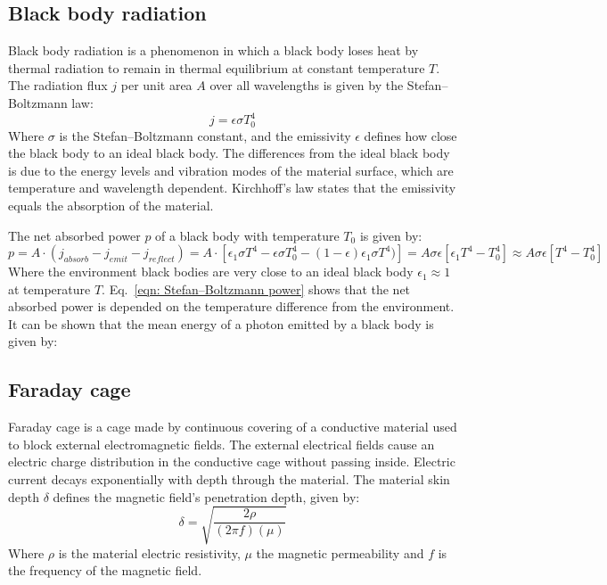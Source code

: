 \documentclass[\main/master.tex]{subfiles}
\begin{document}
\subsection{Black body radiation}
Black body radiation is a phenomenon in which a black body loses heat by thermal radiation to remain in thermal equilibrium at constant temperature $T$. The radiation flux $j$ per unit area $A$ over all wavelengths is given by the Stefan–Boltzmann law:
\begin{equation}
j = \epsilon\sigma T_0^4  \label{eqn: Stefan–Boltzmann law}
\end{equation}
Where $\sigma$ is the Stefan–Boltzmann constant, and the emissivity $\epsilon$ defines how close the black body to an ideal black body. The differences from the ideal black body is due to the energy levels and vibration modes of the material surface, which are temperature and wavelength dependent. Kirchhoff's law states that the emissivity equals the absorption of the material.
\par\noindent
The net absorbed power $p$ of a black body with temperature $T_0$ is given by: 
\begin{equation}
p = A\cdot(j_{absorb}-j_{emit}-j_{reflect})= A \cdot[\epsilon_1\sigma T^4-\epsilon\sigma T_0^4-(1-\epsilon)\epsilon_1\sigma T^4)] = A \sigma\epsilon[\epsilon_1 T^4- T_0^4] \approx A \sigma\epsilon[ T^4- T_0^4]  \label{eqn: Stefan–Boltzmann power}
\end{equation}
Where the environment black bodies are very close to an ideal black body $ \epsilon_1\approx 1$ at temperature $T$. Eq.~\ref{eqn: Stefan–Boltzmann power} shows that the net absorbed power is depended on the temperature difference from the environment.
It can be shown that the mean energy of a photon emitted by a black body is given by:


\subsection{Faraday cage}
\par\noindent
Faraday cage is a cage made by continuous covering of a conductive material used to block external electromagnetic fields. The external electrical fields cause an electric charge distribution in the conductive cage without passing inside. Electric current decays exponentially with depth through the material. The material skin depth $\delta$ defines the magnetic field's penetration depth, given by:
\begin{equation}
\delta = \sqrt{\frac{2\rho}{(2\pi f)(\mu)} }    \label{eqn:skin depth}
\end{equation}
Where $\rho$ is the material electric resistivity, $\mu$ the magnetic permeability and $f$ is the frequency of the magnetic field.
\end{document}

